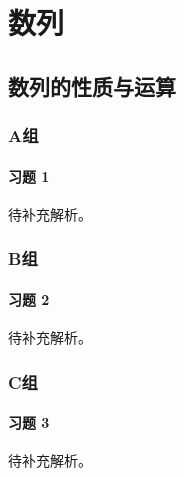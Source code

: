 \chapter{数列}

\section{数列的性质与运算}

\subsection*{A组}

\subsubsection*{习题 1}
\begin{solution}
	待补充解析。
\end{solution}

\subsection*{B组}

\subsubsection*{习题 2}
\begin{solution}
	待补充解析。
\end{solution}

\subsection*{C组}

\subsubsection*{习题 3}
\begin{solution}
	待补充解析。
\end{solution}
